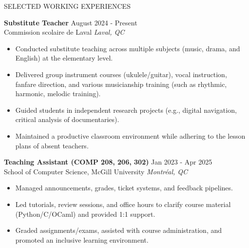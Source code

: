 \documentclass{resume} %
\begin{document}



\begin{rSection}{SELECTED WORKING EXPERIENCES}


\textbf{Substitute Teacher} \hfill August 2024 - Present\\
Commission scolaire de Laval \hfill \textit{Laval, QC}
\begin{itemize}
    \itemsep -3pt {}
    \item Conducted substitute teaching across multiple subjects (music, drama, and English) at the elementary level.
    \item Delivered group instrument courses (ukulele/guitar), vocal instruction, fanfare direction, and various musicianship training (such as rhythmic, harmonic, melodic training).
    \item Guided students in independent research projects (e.g., digital navigation, critical analysis of documentaries).
    \item Maintained a productive classroom environment while adhering to the lesson plans of absent teachers.
\end{itemize}

\textbf{Teaching Assistant (COMP 208, 206, 302)} \hfill Jan 2023 - Apr 2025\\
School of Computer Science, McGill University \hfill \textit{Montréal, QC}
\begin{itemize}
    \itemsep -3pt {}
    \item Managed announcements, grades, ticket systems, and feedback pipelines.
    \item Led tutorials, review sessions, and office hours to clarify course material (Python/C/OCaml) and provided 1:1 support.
    \item Graded assignments/exams, assisted with course administration, and promoted an inclusive learning environment.
\end{itemize}


\end{rSection}
\end{document}
